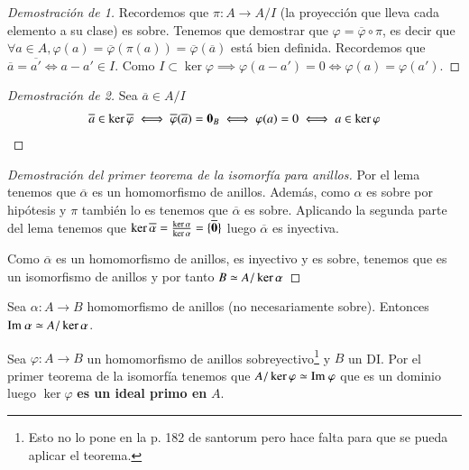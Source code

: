 \begin{proof}[Demostración de 1]
	Recordemos que $\pi:A \to A/I$ (la proyección que lleva cada elemento a su clase) es sobre. Tenemos que demostrar que $\varphi = \overline{\varphi} \circ \pi$, es decir que $\forall a \in A, \varphi(a) = \overline{\varphi}(\pi(a))= \overline{\varphi}(\overline{a})$ está bien definida. Recordemos que $\overline{a} = \overline{a'} \iff a - a' \in I$. Como $I \subset \ker \varphi \implies \varphi(a - a') = 0 \iff \varphi(a) = \varphi(a')$.
\end{proof}

\begin{proof}[Demostración de 2]
	Sea $\overline{a} \in A/I$
	\begin{align*}
		\overline{a} \in \ker \overline{\varphi} \iff \overline{\varphi}(\overline{a}) = \mathbf{0}_B \iff \varphi(a) = 0 \iff a \in \ker \varphi
	\end{align*}
\end{proof}

\begin{proof}[Demostración del primer teorema de la isomorfía para anillos]
	Por el lema tenemos que $\overline{\alpha}$ es un homomorfismo de anillos. Además, como $\alpha$ es sobre por hipótesis y $\pi$ también lo es tenemos que $\overline{\alpha}$ es sobre. Aplicando la segunda parte del lema tenemos que $\ker \overline{\alpha} = \frac{\ker \alpha}{\ker \alpha} = \{\overline{\mathbf{0}}\}$ luego $\overline{\alpha}$ es inyectiva.
	
	Como $\overline{\alpha}$ es un homomorfismo de anillos, es inyectivo y es sobre, tenemos que es un isomorfismo de anillos y por tanto $B \simeq A / \ker \alpha$
\end{proof}

\begin{cor}
	Sea $\alpha: A \to B$ homomorfismo de anillos (no necesariamente sobre). Entonces $\text{Im } \alpha \simeq A / \ker \alpha$.
\end{cor}

\begin{obs}
	Sea $\varphi:A \to B$ un homomorfismo de anillos sobreyectivo\footnote{Esto no lo pone en la p. 182 de santorum pero hace falta para que se pueda aplicar el teorema.} y $B$ un DI. Por el primer teorema de la isomorfía tenemos que $A / \ker \varphi \simeq \text{Im } \varphi$ que es un dominio luego $\ker \varphi$ \textbf{es un ideal primo en} $A$.
\end{obs}


